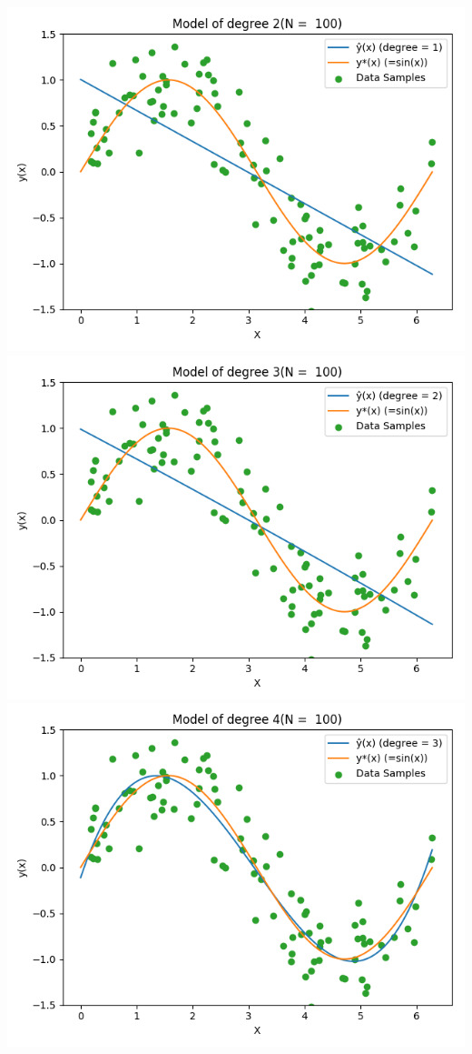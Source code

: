 \documentclass{article}
\begin{document}
\includegraphics[width=\linewidth]{2_100.png}
\includegraphics[width=\linewidth]{3_100.png}
\includegraphics[width=\linewidth]{4_100.png}
\end{document}
